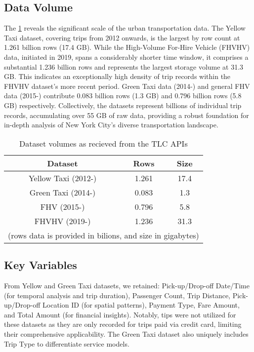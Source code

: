 \documentclass[conference]{IEEEtran}
\begin{document}
\subsection{Data Volume}
The \ref{tab:raw-volumes} reveals the significant scale of the urban transportation data. The Yellow Taxi dataset,
covering trips from 2012 onwards, is the largest by row count at 1.261 billion rows (17.4 GB). While the High-Volume
For-Hire Vehicle (FHVHV) data, initiated in 2019, spans a considerably shorter time window, it comprises a substantial
1.236 billion rows and represents the largest storage volume at 31.3 GB. This indicates an exceptionally high density
of trip records within the FHVHV dataset's more recent period. Green Taxi data (2014-) and general FHV data (2015-)
contribute 0.083 billion rows (1.3 GB) and 0.796 billion rows (5.8 GB) respectively. Collectively, the datasets
represent billions of individual trip records, accumulating over 55 GB of raw data, providing a robust foundation
for in-depth analysis of New York City's diverse transportation landscape.

\begin{table}[]
  \label{tab:raw-volumes}
  \caption{Dataset volumes as recieved from the TLC APIs }
  \centering
  \begin{tabular}{ccc}
    \textbf{Dataset}& \textbf{Rows}& \textbf{Size}\\
    \hline \hline
    Yellow Taxi (2012-)&1.261& 17.4\\
    Green Taxi (2014-)&0.083& 1.3\\
    FHV (2015-)&0.796& 5.8\\
    FHVHV (2019-)&1.236& 31.3\\
    \hline
    \multicolumn{3}{c}{(rows data is provided in bilions, and size in gigabytes)}
  \end{tabular}
\end{table}

\subsection{Key Variables}
From Yellow and Green Taxi datasets, we retained: Pick-up/Drop-off Date/Time (for temporal analysis and trip duration),
Passenger Count, Trip Distance, Pick-up/Drop-off Location ID (for spatial patterns), Payment Type, Fare Amount, and
Total Amount (for financial insights). Notably, tips were not utilized for these datasets as they are only recorded
for trips paid via credit card, limiting their comprehensive applicability. The Green Taxi dataset also uniquely
includes Trip Type to differentiate service models.
\end{document}
